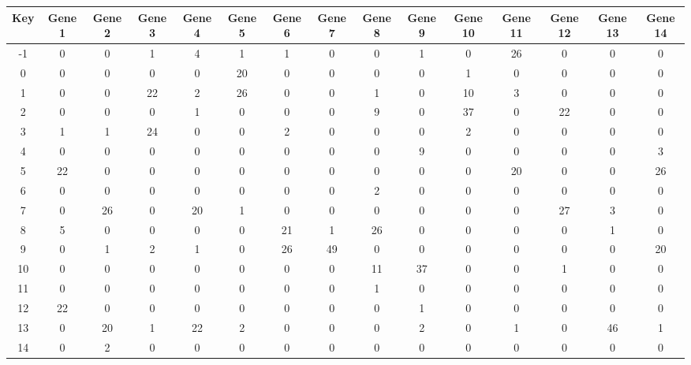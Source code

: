 \begin{tabular}{|c|c|c|c|c|c|c|c|c|c|c|c|c|c|c|}
\hline
Key & Gene 1 & Gene 2 & Gene 3 & Gene 4 & Gene 5 & Gene 6 & Gene 7 & Gene 8 & Gene 9 & Gene 10 & Gene 11 & Gene 12 & Gene 13 & Gene 14 \\
\hline
-1 & 0 & 0 & 1 & 4 & 1 & 1 & 0 & 0 & 1 & 0 & 26 & 0 & 0 & 0 \\
0 & 0 & 0 & 0 & 0 & 20 & 0 & 0 & 0 & 0 & 1 & 0 & 0 & 0 & 0 \\
1 & 0 & 0 & 22 & 2 & 26 & 0 & 0 & 1 & 0 & 10 & 3 & 0 & 0 & 0 \\
2 & 0 & 0 & 0 & 1 & 0 & 0 & 0 & 9 & 0 & 37 & 0 & 22 & 0 & 0 \\
3 & 1 & 1 & 24 & 0 & 0 & 2 & 0 & 0 & 0 & 2 & 0 & 0 & 0 & 0 \\
4 & 0 & 0 & 0 & 0 & 0 & 0 & 0 & 0 & 9 & 0 & 0 & 0 & 0 & 3 \\
5 & 22 & 0 & 0 & 0 & 0 & 0 & 0 & 0 & 0 & 0 & 20 & 0 & 0 & 26 \\
6 & 0 & 0 & 0 & 0 & 0 & 0 & 0 & 2 & 0 & 0 & 0 & 0 & 0 & 0 \\
7 & 0 & 26 & 0 & 20 & 1 & 0 & 0 & 0 & 0 & 0 & 0 & 27 & 3 & 0 \\
8 & 5 & 0 & 0 & 0 & 0 & 21 & 1 & 26 & 0 & 0 & 0 & 0 & 1 & 0 \\
9 & 0 & 1 & 2 & 1 & 0 & 26 & 49 & 0 & 0 & 0 & 0 & 0 & 0 & 20 \\
10 & 0 & 0 & 0 & 0 & 0 & 0 & 0 & 11 & 37 & 0 & 0 & 1 & 0 & 0 \\
11 & 0 & 0 & 0 & 0 & 0 & 0 & 0 & 1 & 0 & 0 & 0 & 0 & 0 & 0 \\
12 & 22 & 0 & 0 & 0 & 0 & 0 & 0 & 0 & 1 & 0 & 0 & 0 & 0 & 0 \\
13 & 0 & 20 & 1 & 22 & 2 & 0 & 0 & 0 & 2 & 0 & 1 & 0 & 46 & 1 \\
14 & 0 & 2 & 0 & 0 & 0 & 0 & 0 & 0 & 0 & 0 & 0 & 0 & 0 & 0 \\
\hline
\end{tabular}